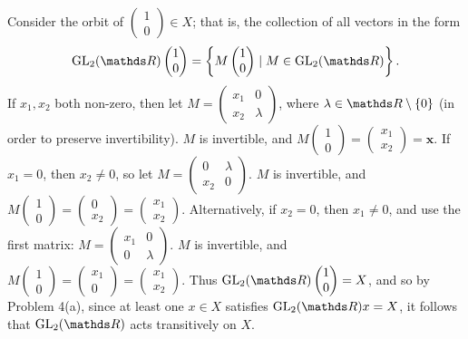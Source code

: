 \documentclass{homework}
\begin{document}
\begin{solution}
\begin{enumerate}[label=(\alph*)]
\begin{itemize}
          Consider the orbit of $\begin{pmatrix} 1\\0 \end{pmatrix} \in X$; that is, the collection
          of all vectors in the form \[
            \GL_{2}(\R)\begin{pmatrix} 1\\0 \end{pmatrix} =\left\{M\begin{pmatrix} 1\\0
          \end{pmatrix} \mid M\in \GL_{2}(\R)\right\} 
            .\] If $x_1,x_2$ both non-zero, then let $M=\begin{pmatrix} x_1&0\\x_2&\lambda
          \end{pmatrix}$, where $\lambda\in \R\setminus \{ 0 \}$ (in order to preserve
          invertibility). $M$ is invertible, and $M\begin{pmatrix} 1\\0 \end{pmatrix}
          =\begin{pmatrix} x_1\\x_2 \end{pmatrix}=\textbf{x} $. If $x_1=0$, then $x_2\neq 0$, so let
            $M=\begin{pmatrix} 0&\lambda\\x_2&0 \end{pmatrix} $. $M$ is invertible, and
            $M\begin{pmatrix} 1\\0 \end{pmatrix} =\begin{pmatrix} 0\\x_2 \end{pmatrix}
            =\begin{pmatrix} x_1\\x_2 \end{pmatrix} $.
            Alternatively, if $x_2=0$, then $x_1\neq 0$, and use the first matrix:
            $M=\begin{pmatrix} x_1&0\\0&\lambda \end{pmatrix} $. $M$ is invertible, and
            $M\begin{pmatrix} 1\\0 \end{pmatrix} =\begin{pmatrix} x_1\\0 \end{pmatrix}
            =\begin{pmatrix} x_1\\x_2 \end{pmatrix} $. Thus $\GL_{2}(\R)\begin{pmatrix} 1\\0
          \end{pmatrix} =X$, and so by Problem 4(a), since at least one $x\in X$ satisfies
          $\GL_{2}(\R)x=X$, it follows that $\GL_{2}(\R)$ acts transitively on $X$.


\end{itemize}
\end{enumerate}
\end{solution}
\end{document}
